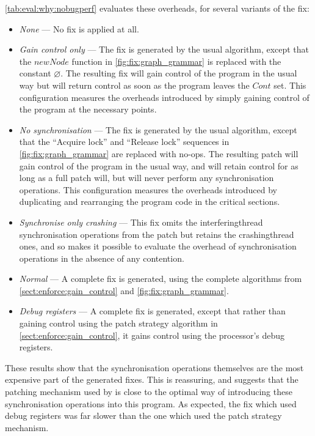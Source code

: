 \autoref{tab:eval:why:nobugperf} evaluates these overheads, for
several variants of the fix:
\begin{itemize}
\item \textit{None} --- No fix is applied at all.
\item \textit{Gain control only} --- The fix is generated by the usual
  algorithm, except that the $\mathit{newNode}$ function in
  \autoref{fig:fix:graph_grammar} is replaced with the constant
  $\varnothing$.  The resulting fix will gain control of the program
  in the usual way but will return control as soon as the program
  leaves the $\mathit{Cont}$ set.  This configuration measures the
  overheads introduced by simply gaining control of the program at the
  necessary points.
\item \textit{No synchronisation} --- The fix is generated by the
  usual algorithm, except that the ``Acquire lock'' and ``Release
  lock'' sequences in \autoref{fig:fix:graph_grammar} are replaced
  with no-ops.  The resulting patch will gain control of the program
  in the usual way, and will retain control for as long as a full
  patch will, but will never perform any synchronisation operations.
  This configuration measures the overheads introduced by duplicating
  and rearranging the program code in the critical sections.
\item \textit{Synchronise only crashing} --- This fix omits the
  \gls{interferingthread} synchronisation operations from the patch
  but retains the \gls{crashingthread} ones, and so makes it possible
  to evaluate the overhead of synchronisation operations in the
  absence of any contention.
\item \textit{Normal} --- A complete fix is generated, using the
  complete algorithms from \autoref{sect:enforce:gain_control} and
  \autoref{fig:fix:graph_grammar}.
\item \textit{Debug registers} --- A complete fix is generated, except
  that rather than gaining control using the patch strategy algorithm
  in \autoref{sect:enforce:gain_control}, it gains control using the
  processor's debug registers.
\end{itemize}
 These results show that the
synchronisation operations themselves are the most expensive part of
the generated fixes.  This is reassuring, and suggests that the
patching mechanism used by {\technique} is close to the optimal way of
introducing these synchronisation operations into this program.  As
expected, the fix which used debug registers was far slower than the
one which used the patch strategy mechanism.

